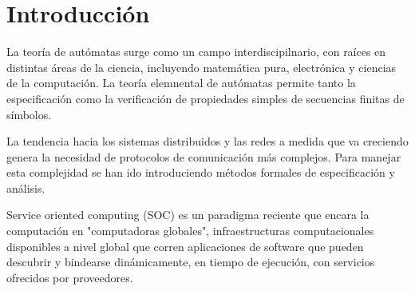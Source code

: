 \section{Introducción}
La teoría de autómatas surge como un campo interdiscipilnario, con raíces en distintas áreas de la ciencia, incluyendo matemática pura, electrónica y ciencias de la computación. La teoría elemnental de autómatas permite tanto la especificación como la verificación de propiedades simples de secuencias finitas de símbolos. 

La tendencia hacia los sistemas distribuidos y las redes a medida que va creciendo genera la necesidad de protocolos de comunicación más complejos. Para manejar esta complejidad se han ido introduciendo métodos formales de especificación y análisis. 

Service oriented computing (SOC) es un paradigma reciente que encara la computación en "computadoras globales", infraestructuras computacionales disponibles a nivel global que corren aplicaciones de software que pueden descubrir y bindearse dinámicamente, en tiempo de ejecución, con servicios ofrecidos por proveedores. 
